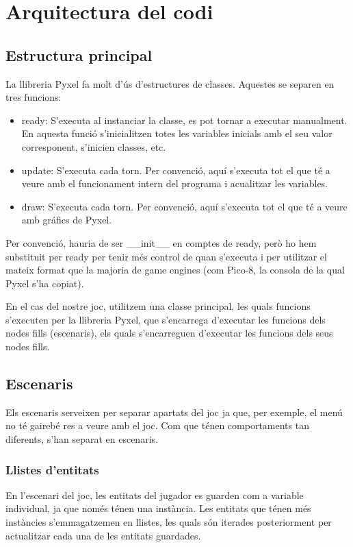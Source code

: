 \section{Arquitectura del codi}

\subsection{Estructura principal}
La llibreria Pyxel fa molt d'\'us d'estructures de classes.
Aquestes se separen en tres funcions:

\begin{itemize}
\item{ready:
	S'executa al instanciar la classe, es pot tornar a executar manualment.
	En aquesta funci\'o s'inicialitzen totes les variables inicials amb el seu valor
	corresponent, s'inicien classes, etc.
	}
\item{update:
	S'executa cada torn. 
	Per convenci\'o, aqu\'i s'executa tot el que t\'e a veure amb
	el funcionament intern del programa i acualitzar les variables.
	}
\item{draw:
	S'executa cada torn.
	Per convenci\'o, aqu\'i s'executa tot el que t\'e a veure amb
	gr\'afics de Pyxel.
}
\end{itemize}

Per convenci\'o, hauria de ser \_\_init\_\_ en comptes de ready,
per\`o ho hem substituit per ready per
tenir m\'es control de quan s'executa i per
utilitzar el mateix format que la majoria de game engines
(com Pico-8, la consola de la qual Pyxel s'ha copiat).

En el cas del nostre joc,
utilitzem una classe principal, les quals funcions s'executen per la llibreria Pyxel,
que s'encarrega d'executar les funcions dels nodes fills (escenaris),
els quals s'encarreguen d'executar les funcions dels seus nodes fills.


\subsection{Escenaris}

Els escenaris serveixen per separar apartats del joc
ja que, per exemple, el men\'u no t\'e gaireb\'e res a veure amb el joc.
Com que t\'enen comportaments tan diferents, s'han separat en escenaris.


\subsubsection{Llistes d'entitats}
En l'escenari del joc, les entitats del jugador es guarden com a variable individual,
ja que nom\'es t\'enen una inst\`ancia.
Les entitats que t\'enen m\'es inst\`ancies s'emmagatzemen en llistes,
les quals s\'on iterades posteriorment per
actualitzar cada una de les entitats guardades.

